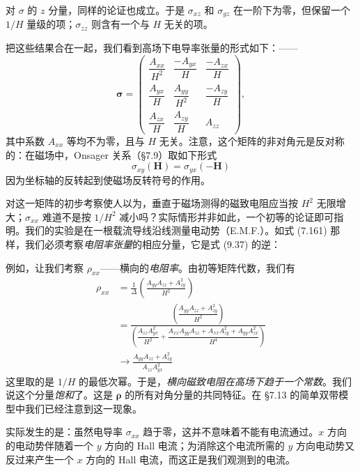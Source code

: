 对 $\sigma$ 的 $z$ 分量，同样的论证也成立。于是 $\sigma_{xz}$ 和 $\sigma_{yz}$ 在一阶下为零，但保留一个 $1/H$ 量级的项；$\sigma_{zz}$ 则含有一个与 $H$ 无关的项。

把这些结果合在一起，我们看到高场下电导率张量的形式如下：——
\begin{equation*}
\boldsymbol{\sigma}=\begin{pmatrix}
\dfrac{A_{xx}}{H^{2}} & \dfrac{-A_{yx}}{H} & \dfrac{-A_{zx}}{H}\\[10pt]
\dfrac{A_{yx}}{H} & \dfrac{A_{yy}}{H^{2}} & \dfrac{-A_{zy}}{H}\\[10pt]
\dfrac{A_{zx}}{H} & \dfrac{A_{zy}}{H} & A_{zz}
\end{pmatrix}, \tag{9.37}
\end{equation*}
其中系数 $A_{xx}$ 等均不为零，且与 $H$ 无关。注意，这个矩阵的非对角元是反对称的：在磁场中，Onsager 关系（§7.9）取如下形式
\begin{equation*}
\sigma_{xy}(\mathbf{H})=\sigma_{yx}(-\mathbf{H}) \tag{9.38}
\end{equation*}
因为坐标轴的反转起到使磁场反转符号的作用。

对这一矩阵的初步考察使人以为，垂直于磁场测得的磁致电阻应当按 $H^{2}$ 无限增大；$\sigma_{xx}$ 难道不是按 $1/H^{2}$ 减小吗？实际情形并非如此，一个初等的论证即可指明。我们的实验是在一根载流导线沿线测量电动势（E.M.F.）。如式 (7.161) 那样，我们必须考察\emph{电阻率张量}的相应分量，它是式 (9.37) 的逆：

例如，让我们考察 $\rho_{xx}$——横向的\emph{电阻率}。由初等矩阵代数，我们有
\begin{align*}
\rho_{xx}&=\frac{1}{\Delta}\left(\frac{A_{yy}A_{zz}+A_{zy}^{2}}{H^{2}}\right)\\
&=\frac{\left(\dfrac{A_{yy}A_{zz}+A_{zy}^{2}}{H^{2}}\right)}{\left(\dfrac{A_{zz}A_{yx}^{2}}{H^{2}}+\dfrac{A_{xx}A_{yy}A_{zz}+A_{xx}A_{zy}^{2}+A_{yy}A_{zx}^{2}}{H^{4}}\right)}\\
&\to\frac{A_{yy}A_{zz}+A_{zy}^{2}}{A_{zz}A_{yx}^{2}} \tag{9.39}
\end{align*}
这里取的是 $1/H$ 的最低次幂。于是，\emph{横向磁致电阻在高场下趋于一个常数}。我们说这个分量\emph{饱和}了。这是 $\boldsymbol{\rho}$ 的所有对角分量的共同特征。在 §7.13 的简单双带模型中我们已经注意到这一现象。

实际发生的是：虽然电导率 $\sigma_{xx}$ 趋于零，这并不意味着不能有电流通过。$x$ 方向的电动势伴随着一个 $y$ 方向的 Hall 电流；为消除这个电流所需的 $y$ 方向电动势又反过来产生一个 $x$ 方向的 Hall 电流，而这正是我们观测到的电流。

